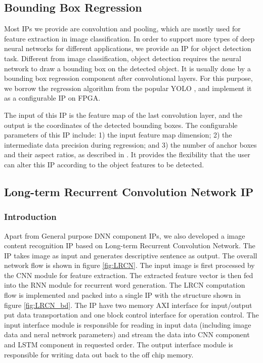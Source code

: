 \documentclass[a4paper, 11pt]{article}
\begin{document}
\subsection{Bounding Box Regression}

Most IPs we provide are convolution and pooling, which are mostly used for feature extraction in image classification.
In order to support more types of deep neural networks for different applications, we provide an IP for object detection task.
Different from image classification, object detection requires the neural network to draw a bounding box on the detected object.
It is usually done by a bounding box regression component after convolutional layers. For this purpose, we borrow the regression algorithm from the popular YOLO \cite{r7}, and implement it as a configurable IP on FPGA.



The input of this IP is the feature map of the last convolution layer, and the output is the coordinates of the detected bounding boxes.
The configurable parameters of this IP include:
1) the input feature map dimension; 2) the intermediate data precision during regression; and 3) the number of anchor boxes and their aspect ratios, as described in \cite{r7}.
It provides the flexibility that the user can alter this IP according to the object features to be detected.


\subsection{Long-term Recurrent Convolution Network IP}
\subsubsection{Introduction}
Apart from General purpose DNN component IPs, we also developed a image content recognition IP based on Long-term Recurrent Convolution Network. The IP takes image as input and generates descriptive sentence as output. The  overall network flow is shown in figure \ref{fig:LRCN}. The input image is first processed by the CNN module for feature extraction. The extracted feature vector is then fed into the RNN module for recurrent word generation. The LRCN computation flow is implemented and packed into a single IP with the structure shown in figure \ref{fig:LRCN_bd}. The IP have two memory AXI interface for input/output put data transportation and one block control interface for operation control. The input interface module is responsible for reading in input data (including image data and neral network parameters) and stream the data into CNN component and LSTM component in requested order. The output interface module is responsible for writing data out back to the off chip memory.
\end{document}
